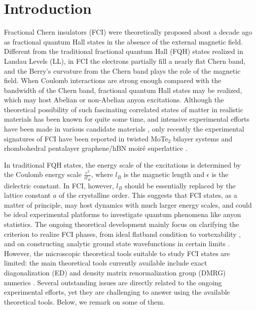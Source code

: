 \section{Introduction}
Fractional Chern insulators (FCI) were theoretically proposed about a decade ago \cite{neupert2011fractional,tang2011high,sheng2011fractional,sun2011nearly,regnault2011fractional,xiao2011interface} as fractional quantum Hall states in the absence of the external magnetic field. Different from the traditional fractional quantum Hall (FQH) states realized in Landau Levels (LL), in FCI the electrons partially fill a nearly flat Chern band, and the Berry's curvature from the Chern band plays the role of the magnetic field. When Coulomb interactions are strong enough compared with the bandwidth of the Chern band, fractional quantum Hall states may be realized, which may host Abelian or non-Abelian anyon excitations. Although the theoretical possibility of such fascinating correlated states of matter in realistic materials has been known for quite some time, and intensive experimental efforts have been made in various candidate materials \cite{xie2021fractional}, only recently the experimental signatures of FCI have been reported in twisted MoTe$_2$ bilayer systems \cite{cai2023signatures,zeng2023thermodynamic,park2023observation,xu2023observation} and rhombohedral pentalayer graphene/hBN moiré superlattice \cite{lu2023fractional}.

In traditional FQH states, the energy scale of the excitations is determined by the Coulomb energy scale $\frac{e^2}{\epsilon l_B}$, where $l_B$ is the magnetic length and $\epsilon$ is the dielectric constant. In FCI, however, $l_B$ should be essentially replaced by the lattice constant $a$ of the crystalline order. This suggests that FCI states, as a matter of principle, may host dynamics with much larger energy scales, and could be ideal experimental platforms to investigate quantum phenomena like anyon statistics. The ongoing theoretical development mainly focus on clarifying the criterion to realize FCI phases, from ideal flatband condition to vortexability \cite{roy2014band,wang2021exact,wang2023origin,ledwith2023vortexability}, and on constructing analytic ground state wavefunctions in certain limits \cite{ledwith2020fractional,dong2023many,wang2023origin}. However, the microscopic theoretical tools suitable to study FCI states are limited: the main theoretical tools currently available include exact diagonalization (ED) and density matrix renormalization group (DMRG) numerics \cite{haldane1985finite,feiguin2008density,dong2023anomalous,dong2023composite,yu2023fractional,goldman2023zero,dong2023theory}. Several outstanding issues are directly related to the ongoing experimental efforts, yet they are challenging to answer using the available theoretical tools. Below, we remark on some of them.

